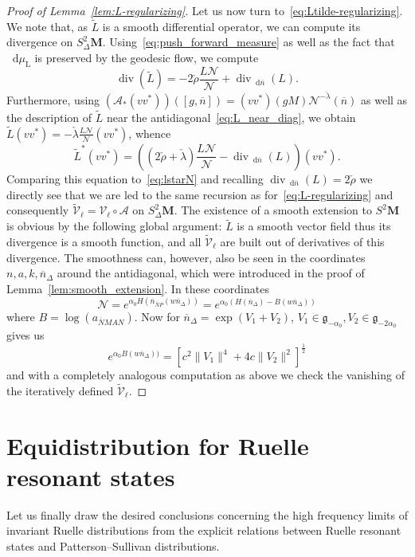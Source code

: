 \documentclass[AHL, Unicode, longabstracts, published]{cedram}
\DeclareMathOperator{\Div}{div}
\newcommand{\rml}{\mathrm{L}}
\newcommand{\mc}{\mathcal}
\newcommand{\bfm}{\mathbf{M}}
\newcommand{\til}{\widetilde}
\newcommand{\intd}{\mathop{}\!\mathrm{d}}
\newcommand{\g}{\mathfrak g}
\newcommand{\bn}{{\overline{n}}}
\newcommand{\bN}{{\overline{N}}}
\begin{document}
\begin{proof}[Proof of Lemma~\ref{lem:L-regularizing}]
Let us now turn to~\eqref{eq:Ltilde-regularizing}. We note that, as $\til L$ is a smooth differential operator, we can compute its divergence on $S^2_\Delta\mathbf M$. Using~\eqref{eq:push_forward_measure} as well as the fact that $\intd \mu_{\rml}$ is preserved by the geodesic flow, we compute
\[
\Div\left(\til L\right) = -2\check\rho\frac{L\mc{N}}{\mc{N}} + \Div_{\intd \bn}(L).
\]
Furthermore, using $(\mathcal A_*(vv^*))([g,\bn]) = (vv^ *)(gM) \mc{N}^{-\check \lambda}(\bn)$ as well as the description of $\til L$ near the antidiagonal~\eqref{eq:L_near_diag}, we obtain $\til L (vv^*) = -\check\lambda \frac{L\mc{N}}{\mc{N}} (vv^*)$, whence
\[
\til L^*(vv^*) = \left(\left(2\check \rho+\check \lambda\right)\frac{L\mc{N}}{\mc{N}} -
\Div_{\intd \bn}(L)\right)(vv^*).
\]
Comparing this equation to~\eqref{eq:lstarN} and recalling $\Div_{\intd \bn}(L)=2\check\rho$ we directly see that we are led to the same recursion as for~\eqref{eq:L-regularizing} and consequently $\til{\mc V}_\ell = \mc V_\ell\circ\mc A$ on $S^2_\Delta{\bfm}$. The existence of a smooth extension to $S^2\bfm$ is obvious by the following global argument: $\til L$ is a smooth vector field thus its divergence is a smooth function, and all $\til{\mathcal V}_{\ell}$ are built out of derivatives of this divergence. The smoothness can, however, also be seen in the coordinates $n,a, k,\bn_\Delta$ around the antidiagonal, which were introduced in the proof of Lemma~\ref{lem:smooth_extension}. In these coordinates
\[
\mc{N} = e^{\alpha_0 H(\bn_{\bN P}(w\bn_\Delta))} = e^{\alpha_0 (H(\bn_\Delta) - B(w\bn_\Delta))}
\]
where $B=\log(a_{\bN MAN})$. Now for $\bn_\Delta = \exp(V_1+V_2)$, $V_1\in\g_{-\alpha_0}, V_2\in\g_{-2\alpha_0}$~\cite[Theorem~IX.3.8]{Hel78} gives us
\[
e^{\alpha_0 B(w\bn_\Delta))} = \left[c^2\|V_1\|^4 + 4c\|V_2\|^2\right]^{\frac{1}{2}}
\]
and with a completely analogous computation as above we check the vanishing of the iteratively defined $\til{\mathcal V}_{\ell}$.
\end{proof}



\section{Equidistribution for Ruelle resonant states}
Let us finally draw the desired conclusions concerning the high frequency limits of invariant Ruelle distributions from the explicit relations between Ruelle resonant states and Patterson--Sullivan distributions.
\end{document}
